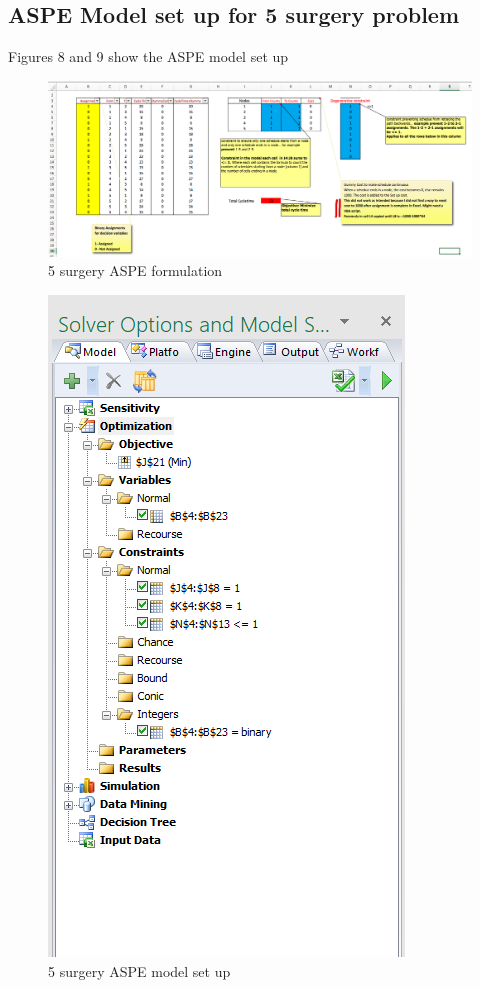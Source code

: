 \documentclass[]{article}
\begin{document}
\subsection{ASPE Model set up for 5 surgery
problem}\label{aspe-model-set-up-for-5-surgery-problem}

Figures 8 and 9 show the ASPE model set up

\begin{figure}[h]

{\centering \includegraphics{Figures/Homework3/p3a} 

}

\caption{5 surgery ASPE formulation}\label{fig:unnamed-chunk-8}
\end{figure}

\begin{figure}[h]

{\centering \includegraphics{Figures/Homework3/modelp3a} 

}

\caption{5 surgery ASPE model set up}\label{fig:unnamed-chunk-9}
\end{figure}
\end{document}
